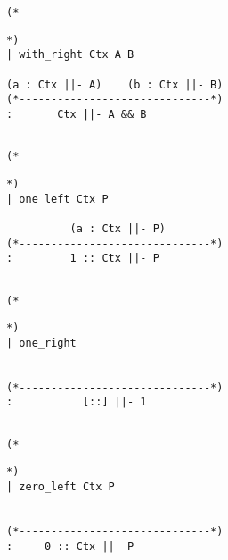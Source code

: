 \documentclass{article}
\theoremstyle{definition}
\begin{document}
\noindent\begin{minipage}{\textwidth}
\begin{verbatim}
(*
\end{verbatim}
\begin{center}\usebox{\withR}\end{center}
\begin{verbatim}
*)
| with_right Ctx A B 

(a : Ctx ||- A)    (b : Ctx ||- B)
(*------------------------------*)
:       Ctx ||- A && B


\end{verbatim}
\end{minipage}

\noindent\begin{minipage}{\textwidth}
\begin{verbatim}
(*
\end{verbatim}
\begin{center}\usebox{\oneL}\end{center}
\begin{verbatim}
*)
| one_left Ctx P

          (a : Ctx ||- P)
(*------------------------------*)
:         1 :: Ctx ||- P


\end{verbatim}
\end{minipage}

\noindent\begin{minipage}{\textwidth}
\begin{verbatim}
(*
\end{verbatim}
\begin{center}\usebox{\oneR}\end{center}
\begin{verbatim}
*)
| one_right


(*------------------------------*)
:           [::] ||- 1


\end{verbatim}
\end{minipage}

\noindent\begin{minipage}{\textwidth}
\begin{verbatim}
(*
\end{verbatim}
\begin{center}\usebox{\zeroL}\end{center}
\begin{verbatim}
*)
| zero_left Ctx P


(*------------------------------*)
:     0 :: Ctx ||- P


\end{verbatim}
\end{minipage}
\end{document}
